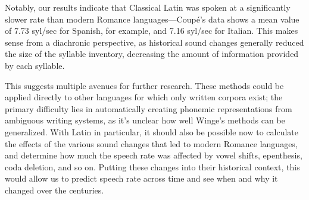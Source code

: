 \documentclass[12pt]{article}
\begin{document}
Notably, our results indicate that Classical Latin was spoken at a significantly slower rate than modern Romance languages---Coupé's data shows a mean value of 7.73 syl/sec for Spanish, for example, and 7.16 syl/sec for Italian. This makes sense from a diachronic perspective, as historical sound changes generally reduced the size of the syllable inventory, decreasing the amount of information provided by each syllable.

This suggests multiple avenues for further research. These methods could be applied directly to other languages for which only written corpora exist; the primary difficulty lies in automatically creating phonemic representations from ambiguous writing systems, as it's unclear how well Winge's methods can be generalized. With Latin in particular, it should also be possible now to calculate the effects of the various sound changes that led to modern Romance languages, and determine how much the speech rate was affected by vowel shifts, epenthesis, coda deletion, and so on. Putting these changes into their historical context, this would allow us to predict speech rate across time and see when and why it changed over the centuries.

\nocite{*}

\printbibliography
\end{document}

